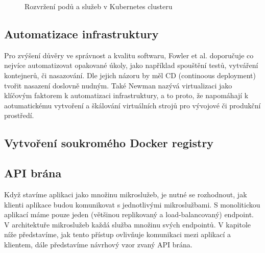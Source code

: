 \documentclass[thesis=M,czech]{FITthesis}[2019/12/23]
\theoremstyle{plain}
\theoremstyle{definition}
\begin{document}
\begin{figure}[H]\centering
	

	\caption[Rozvržení podů a služeb v Kubernetes clusteru]{Rozvržení podů a služeb v Kubernetes clusteru}\label{fig:float}
\end{figure}







\subsection{Automatizace infrastruktury}

Pro zvýšení důvěry ve správnost a kvalitu softwaru, Fowler et al. \cite{microservices-article} doporučuje co nejvíce automatizovat opakované úkoly, jako například spouštění testů, vytváření kontejnerů, či nasazování. Dle jejich názoru by měl CD (continoous deployment) tvořit nasazení doslovně nudným. Také Newman \cite{microservices-book} nazývá virtualizaci jako klíčovým faktorem k automatizaci infrastruktury, a to proto, že napomáhají k aotumatickému vytvoření a škálování virtuálních strojů pro vývojové či produkční prostředí.



\subsection{Vytvoření soukromého Docker registry}




\subsection{API brána}

Když stavíme aplikaci jako množinu mikroslužeb, je nutné se rozhodnout, jak klienti aplikace budou komunikovat s jednotlivými mikroslužbami. S monolitickou aplikací máme pouze jeden (většinou replikovaný a load-balancovaný) endpoint. V architektuře mikroslužeb každá služba množinu svých endpointů. V kapitole níže představíme, jak tento přístup ovlivňuje komunikaci mezi aplikací a klientem, dále představíme návrhový vzor zvaný API brána.  
\end{document}
